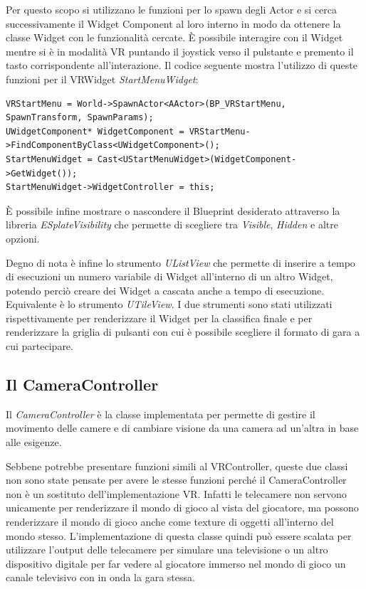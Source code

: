     Per questo scopo si utilizzano le funzioni per lo spawn degli Actor e si cerca successivamente il Widget Component al loro interno in modo da ottenere la classe Widget con le funzionalità cercate.
    È possibile interagire con il Widget mentre si è in modalità VR puntando il joystick verso il pulstante e premento il tasto corrispondente all'interazione.
    Il codice seguente mostra l'utilizzo di queste funzioni per il VRWidget \textit{StartMenuWidget}:

    \begin{lstlisting}[caption = Creazione Widget VR per la classe \textit{StartMenuWidget}]
VRStartMenu = World->SpawnActor<AActor>(BP_VRStartMenu, SpawnTransform, SpawnParams);
UWidgetComponent* WidgetComponent = VRStartMenu->FindComponentByClass<UWidgetComponent>();
StartMenuWidget = Cast<UStartMenuWidget>(WidgetComponent->GetWidget());
StartMenuWidget->WidgetController = this;
    \end{lstlisting}

    È possibile infine mostrare o nascondere il Blueprint desiderato attraverso la libreria \textit{ESplateVisibility} che permette di scegliere tra \textit{Visible}, \textit{Hidden} e altre opzioni.

    Degno di nota è infine lo strumento \textit{UListView} che permette di inserire a tempo di esecuzioni un numero variabile di Widget all'interno di un altro Widget, potendo perciò creare dei Widget a cascata anche a tempo di esecuzione.
    Equivalente è lo strumento \textit{UTileView}.
    I due strumenti sono stati utilizzati rispettivamente per renderizzare il Widget per la classifica finale e per renderizzare la griglia di pulsanti con cui è possibile scegliere il formato di gara a cui partecipare.

    \subsection{Il {CameraController}}

    Il \textit{CameraController} è la classe implementata per permette di gestire il movimento delle camere e di cambiare visione da una camera ad un'altra in base alle esigenze.
    
    Sebbene potrebbe presentare funzioni simili al VRController, queste due classi non sono state pensate per avere le stesse funzioni perché il CameraController non è un sostituto dell'implementazione VR.
    Infatti le telecamere non servono unicamente per renderizzare il mondo di gioco al vista del giocatore, ma possono renderizzare il mondo di gioco anche come texture di oggetti all'interno del mondo stesso.
    L'implementazione di questa classe quindi può essere scalata per utilizzare l'output delle telecamere per simulare una televisione o un altro dispositivo digitale per far vedere al giocatore immerso nel mondo di gioco un canale televisivo con in onda la gara stessa.

